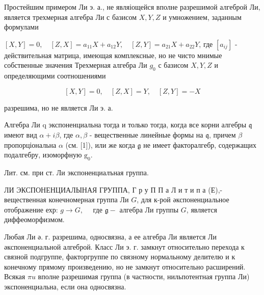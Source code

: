 \documentclass[10pt]{article}
\begin{document}
Простейшим примером Ли э. а., не являіощейся вполне разрешимой алгеброй Ли, является трехмерная алгебра Ли с базисом $X, Y, Z$ и умножением, заданным формулами



$[X, Y]=0, \quad[Z, X]=a_{11} X+a_{12} Y, \quad[Z, Y]=a_{21} X+a_{22} Y$, где $\left[a_{i j}\right]$ - действительная матрица, имеющая комплексные, но не чисто мнимые собственные значения Трехмерная алгебра Ли $g_{0}$ с базисом $X, Y, Z$ и определяющими соотношениями



\[

[X, Y]=0, \quad[Z, X]=Y, \quad[Z, Y]=-X

\]



разрешима, но не является Ли э. а.



Алгебра Ли q экспоненциальна тогда и только тогда, когда все корни алгебры $\mathfrak{q}$ имеют вид $\alpha+i \beta$, где $\alpha, \beta$ - вещественные линейные формы на $\mathfrak{q}$, причем $\beta$ пропорціональна $\alpha$ (см. [1]), или же когда $\mathfrak{g}$ не имеет факторалгебр, содержащих подалгебру, изоморфную $\mathrm{g}_{0}$.



Лит. см. при ст. Ли экспоненциалъная группа.



ЛИ ЭКСПОНЕНЦИАЛЫНАЯ ГРУППА, Г р у П П а Л и т и п а (Е),-вещественная конечномерная группа Ли $G$, для к-рой әкспоненциальное отображение ехр: $g \rightarrow G, \quad$ где $\mathfrak{g}-$ алгебра Ли группы $G$, является диффеоморфизмом.



Любая Ли ә. г. разрешима, односвязна, а ее алгебра Ли является Ли әкспоненциальной алгеброй. Класс Ли э. г. замкнут относительно перехода к связной подгруппе, факторгруппе по связному нормальному делителю и к конечному прямому произведению, но не замкнут относительно расширений. Всякая $\pi u$ вполне разрешимая группа (в частности, нильпотентная группа Ли) экспоненциальна, если она односвязна.
\end{document}
